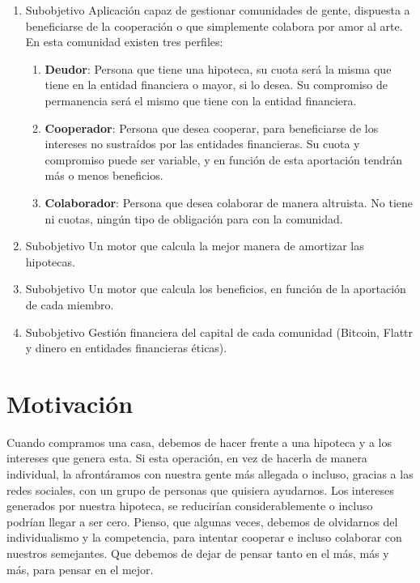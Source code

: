 \documentclass[10pt]{article}
\begin{document}
\begin{enumerate}
  \item Subobjetivo Aplicación capaz de gestionar comunidades de gente, dispuesta a beneficiarse de la cooperación o que simplemente colabora por amor al arte.\\ 
En esta comunidad existen tres perfiles:
\begin{enumerate}
\item \textbf{Deudor}: Persona que tiene una hipoteca, su cuota será la misma que tiene en la entidad financiera o mayor, si lo desea. Su compromiso de permanencia será el mismo que tiene con la entidad financiera.
\item \textbf{Cooperador}: Persona que desea cooperar, para beneficiarse de los intereses no sustraídos por las entidades financieras. Su cuota y compromiso puede ser variable, y en función de esta aportación tendrán más o menos beneficios.
\item \textbf{Colaborador}: Persona que desea colaborar de manera altruista. No tiene ni cuotas, ningún tipo de obligación para con la comunidad.
\end{enumerate}
  \item Subobjetivo Un motor que calcula la mejor manera de amortizar las hipotecas.
  \item Subobjetivo Un motor que calcula los beneficios, en función de la aportación de cada miembro.
  \item Subobjetivo Gestión financiera del capital de cada comunidad (Bitcoin, Flattr y dinero en entidades financieras éticas).
\end{enumerate}


\section{Motivación}

Cuando compramos una casa, debemos de hacer frente a una hipoteca y a los intereses que genera esta. Si esta operación, en vez de hacerla de manera individual, la afrontáramos con nuestra gente más allegada o incluso, gracias a las redes sociales, con un grupo de personas que quisiera ayudarnos. Los intereses generados por nuestra hipoteca, se reducirían considerablemente o incluso podrían llegar a ser cero. Pienso, que algunas veces, debemos de olvidarnos del individualismo y la competencia, para intentar cooperar e incluso colaborar con nuestros semejantes. Que debemos de dejar de pensar tanto en el más, más y más, para pensar en el mejor.
\end{document}
